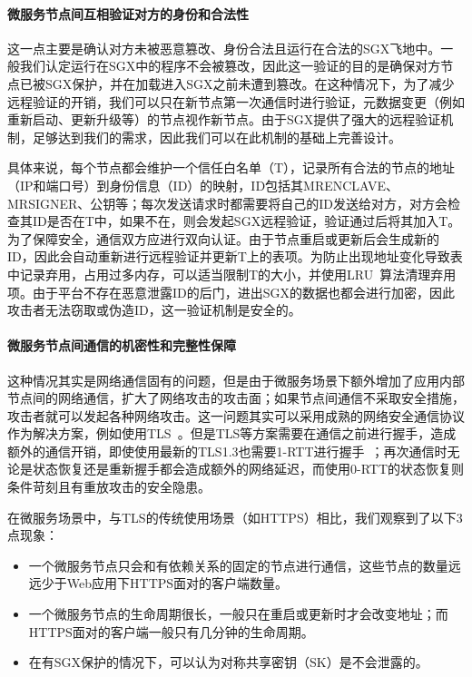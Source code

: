\paragraph{微服务节点间互相验证对方的身份和合法性}
这一点主要是确认对方未被恶意篡改、身份合法且运行在合法的SGX飞地中。一般我们认定运行在SGX中的程序不会被篡改，因此这一验证的目的是确保对方节点已被SGX保护，并在加载进入SGX之前未遭到篡改。在这种情况下，为了减少远程验证的开销，我们可以只在新节点第一次通信时进行验证，元数据变更（例如重新启动、更新升级等）的节点视作新节点。由于SGX提供了强大的远程验证机制，足够达到我们的需求，因此我们可以在此机制的基础上完善设计。

具体来说，每个节点都会维护一个信任白名单（T），记录所有合法的节点的地址（IP和端口号）到身份信息（ID）的映射，ID包括其MRENCLAVE、MRSIGNER、公钥等；每次发送请求时都需要将自己的ID发送给对方，对方会检查其ID是否在T中，如果不在，则会发起SGX远程验证，验证通过后将其加入T。为了保障安全，通信双方应进行双向认证。由于节点重启或更新后会生成新的ID，因此会自动重新进行远程验证并更新T上的表项。为防止出现地址变化导致表中记录弃用，占用过多内存，可以适当限制T的大小，并使用LRU~\cite{}算法清理弃用项。由于平台不存在恶意泄露ID的后门，进出SGX的数据也都会进行加密，因此攻击者无法窃取或伪造ID，这一验证机制是安全的。

\paragraph{微服务节点间通信的机密性和完整性保障}
这种情况其实是网络通信固有的问题，但是由于微服务场景下额外增加了应用内部节点间的网络通信，扩大了网络攻击的攻击面；如果节点间通信不采取安全措施，攻击者就可以发起各种网络攻击。这一问题其实可以采用成熟的网络安全通信协议作为解决方案，例如使用TLS~\cite{}。但是TLS等方案需要在通信之前进行握手，造成额外的通信开销，即使使用最新的TLS1.3也需要1-RTT进行握手~\cite{}；再次通信时无论是状态恢复还是重新握手都会造成额外的网络延迟，而使用0-RTT的状态恢复则条件苛刻且有重放攻击的安全隐患。

在微服务场景中，与TLS的传统使用场景（如HTTPS）相比，我们观察到了以下3点现象：

\begin{itemize}
    \item 一个微服务节点只会和有依赖关系的固定的节点进行通信，这些节点的数量远远少于Web应用下HTTPS面对的客户端数量。
    \item 一个微服务节点的生命周期很长，一般只在重启或更新时才会改变地址；而HTTPS面对的客户端一般只有几分钟的生命周期。
    \item 在有SGX保护的情况下，可以认为对称共享密钥（SK）是不会泄露的。
\end{itemize}

